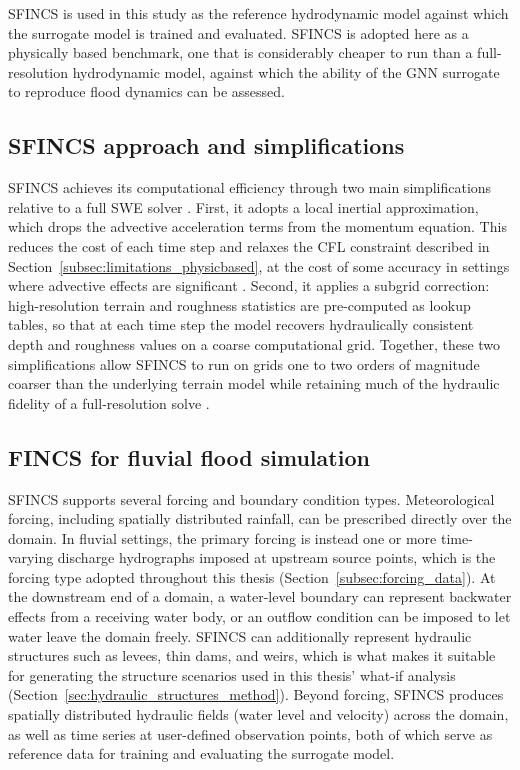 \documentclass[12pt,a4paper]{report}
\begin{document}
SFINCS \citep{leijnse2021sfincs} is used in this study as the reference hydrodynamic
model against which the surrogate model is trained and evaluated. SFINCS is adopted here
as a physically based benchmark, one that is considerably cheaper to run than a
full-resolution hydrodynamic model, against which the ability of the GNN surrogate to
reproduce flood dynamics can be assessed.
 
\subsection{SFINCS approach and simplifications}
\label{subsec:sfincs_simplifications}
 
SFINCS achieves its computational efficiency through two main simplifications relative
to a full SWE solver \citep{vanormondt2025sfincs}. First, it adopts a local inertial
approximation, which drops the advective acceleration terms from the momentum equation.
This reduces the cost of each time step and relaxes the CFL constraint described in
Section~\ref{subsec:limitations_physicbased}, at the cost of some accuracy in settings
where advective effects are significant \citep{bates2010simple}. Second, it applies a
subgrid correction: high-resolution terrain and roughness statistics are pre-computed as
lookup tables, so that at each time step the model recovers hydraulically consistent
depth and roughness values on a coarse computational grid. Together, these two
simplifications allow SFINCS to run on grids one to two orders of magnitude coarser than
the underlying terrain model while retaining much of the hydraulic fidelity of a
full-resolution solve \citep{vanormondt2025sfincs}.
 
\subsection{FINCS for fluvial flood simulation}
\label{subsec:sfincs_fluvialflood}
 
SFINCS supports several forcing and boundary condition types.
Meteorological forcing, including spatially distributed rainfall, can be prescribed
directly over the domain. In fluvial settings, the primary forcing is instead one or
more time-varying discharge hydrographs imposed at upstream source points, which is the
forcing type adopted throughout this thesis (Section~\ref{subsec:forcing_data}). At the
downstream end of a domain, a water-level boundary can represent backwater effects from
a receiving water body, or an outflow condition can be imposed to let water leave the
domain freely. SFINCS can additionally represent hydraulic structures such as levees,
thin dams, and weirs, which is what makes it suitable for generating the structure
scenarios used in this thesis' what-if analysis
(Section~\ref{sec:hydraulic_structures_method}). Beyond forcing, SFINCS produces
spatially distributed hydraulic fields (water level and velocity) across the
domain, as well as time series at user-defined observation points, both of which serve
as reference data for training and evaluating the surrogate model. 
 
\end{document}
